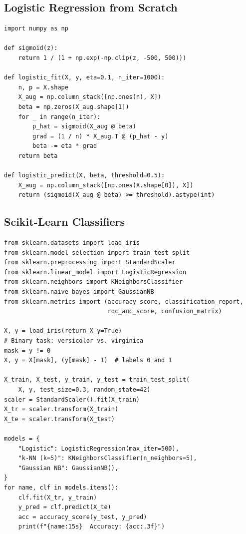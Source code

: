 \subsection{Logistic Regression from Scratch}

\begin{codeblock}[title=\textbf{Logistic Regression --- Gradient Descent}]
\begin{verbatim}
import numpy as np

def sigmoid(z):
    return 1 / (1 + np.exp(-np.clip(z, -500, 500)))

def logistic_fit(X, y, eta=0.1, n_iter=1000):
    n, p = X.shape
    X_aug = np.column_stack([np.ones(n), X])
    beta = np.zeros(X_aug.shape[1])
    for _ in range(n_iter):
        p_hat = sigmoid(X_aug @ beta)
        grad = (1 / n) * X_aug.T @ (p_hat - y)
        beta -= eta * grad
    return beta

def logistic_predict(X, beta, threshold=0.5):
    X_aug = np.column_stack([np.ones(X.shape[0]), X])
    return (sigmoid(X_aug @ beta) >= threshold).astype(int)
\end{verbatim}
\end{codeblock}

\subsection{Scikit-Learn Classifiers}

\begin{codeblock}[title=\textbf{Logistic Regression, k-NN, Naive Bayes with scikit-learn}]
\begin{verbatim}
from sklearn.datasets import load_iris
from sklearn.model_selection import train_test_split
from sklearn.preprocessing import StandardScaler
from sklearn.linear_model import LogisticRegression
from sklearn.neighbors import KNeighborsClassifier
from sklearn.naive_bayes import GaussianNB
from sklearn.metrics import (accuracy_score, classification_report,
                             roc_auc_score, confusion_matrix)

X, y = load_iris(return_X_y=True)
# Binary task: versicolor vs. virginica
mask = y != 0
X, y = X[mask], (y[mask] - 1)  # labels 0 and 1

X_train, X_test, y_train, y_test = train_test_split(
    X, y, test_size=0.3, random_state=42)
scaler = StandardScaler().fit(X_train)
X_tr = scaler.transform(X_train)
X_te = scaler.transform(X_test)

models = {
    "Logistic": LogisticRegression(max_iter=500),
    "k-NN (k=5)": KNeighborsClassifier(n_neighbors=5),
    "Gaussian NB": GaussianNB(),
}
for name, clf in models.items():
    clf.fit(X_tr, y_train)
    y_pred = clf.predict(X_te)
    acc = accuracy_score(y_test, y_pred)
    print(f"{name:15s}  Accuracy: {acc:.3f}")
\end{verbatim}
\end{codeblock}

